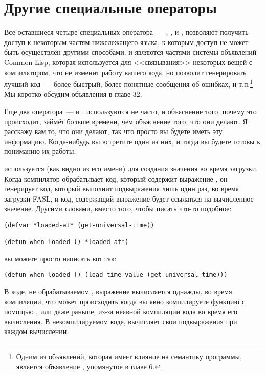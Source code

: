 \section{Другие специальные операторы}

Все оставшиеся четыре специальных оператора~--- , ,
 и , позволяют получить доступ к некоторым частям
нижележащего языка, к которым доступ не может быть осуществлён другими способами.
 и  являются частями системы объявлений Common Lisp, которая
используется для <<связывания>> некоторых вещей с компилятором, что не изменит работу
вашего кода, но позволит генерировать лучший код~--- более быстрый, более понятные
сообщения об ошибках, и т.п.\footnote{Одним из объявлений, которая имеет влияние на
    семантику программы, является объявление , упомянутое в главе 6.}  Мы
    коротко обсудим объявления в главе 32.

Еще два оператора~---  и , используются не часто, и
объяснение того, почему это происходит, займёт больше времени, чем объяснение того, что
они делают. Я расскажу вам то, что они делают, так что просто вы будете иметь эту
информацию. Когда-нибудь вы встретите один из них, и тогда вы будете готовы к пониманию их
работы.

 используется (как видно из его имени) для создания значения во
время загрузки.  Когда компилятор обрабатывает код, который содержит выражение
, он генерирует код, который выполнит подвыражения лишь один раз, во
время загрузки FASL, и код, содержащий выражение  будет ссылаться на
вычисленное значение.  Другими словами, вместо того, чтобы писать что-то подобное:

\begin{lstlisting}
(defvar *loaded-at* (get-universal-time))

(defun when-loaded () *loaded-at*)
\end{lstlisting}

вы можете просто написать вот так:

\begin{lstlisting}
(defun when-loaded () (load-time-value (get-universal-time)))
\end{lstlisting}

В коде, не обрабатываемом , выражение 
вычисляется однажды, во время компиляции, что может происходить когда вы явно компилируете
функцию с помощью , или даже раньше, из-за неявной компиляции кода во время
его вычисления.  В некомпилируемом коде,  вычисляет свои
подвыражения при каждом вычислении.

